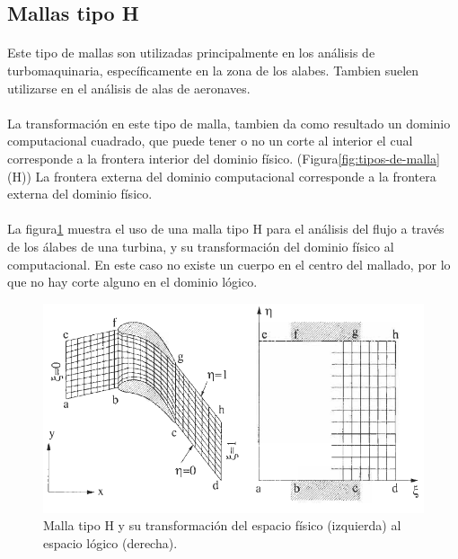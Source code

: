 \documentclass[letterpaper, openright, 12pt]{book}
\begin{document}
    \subsection{Mallas tipo H}
    \paragraph*{}
        Este tipo de mallas son utilizadas principalmente en los análisis de
        turbomaquinaria, específicamente en la zona de los alabes.\cite{blazek}\cite{best-practices-grid-generation}
        Tambien suelen utilizarse en el análisis de alas de aeronaves.\cite{vladimir-grid}
    \paragraph*{}
        La transformación en este tipo de malla, tambien da como resultado un
        dominio computacional cuadrado, que puede tener o no un corte al
        interior el cual corresponde a la frontera interior del dominio físico.
        (Figura\ref*{fig:tipos-de-malla} (H)) La frontera externa del dominio
        computacional corresponde a la frontera externa del dominio físico.

    \paragraph*{}
        La figura\ref{fig:malla-h} muestra el uso de una malla tipo H para el
        análisis del flujo a través de los álabes de una turbina, y su
        transformación del dominio físico al computacional. En este caso no
        existe un cuerpo en el centro del mallado, por lo que no hay corte
        alguno en el dominio lógico.
            \begin{figure}[htbp!]
                \centering
                \includegraphics[width=170mm]{./Imagenes/malla-h}
                \captionsetup{justification=centering, margin=2cm}
                \caption[Malla tipo O]{Malla tipo H y su transformación del espacio físico (izquierda) al espacio lógico (derecha). \cite{blazek}}
            \label{fig:malla-h}
            \end{figure}
\end{document}

